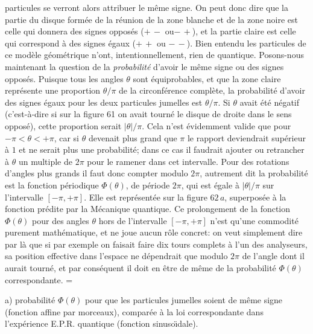 particules se verront alors attribuer le m\^eme signe. On peut donc dire 
que la partie du disque form\'ee de la r\'eunion de la zone blanche et de  
la zone noire est celle  qui donnera des signes oppos\'es ($+\, -$ ou$-\, 
+$), et la partie claire  est celle qui correspond \`a des signes \'egaux 
($+\, +$ ou $-\, -$).    
\medskip 
Bien entendu les particules de ce mod\`ele g\'eom\'etrique n'ont,
intentionnellement, rien de quantique.  
\medskip 
Posons-nous maintenant la question de la {\it probabilit\'e} d'avoir 
le m\^eme signe ou des signes oppos\'es. Puisque tous les angles  
$\theta$ sont \'equiprobables, et que la  zone claire repr\'esente une 
proportion $\theta / \pi$ de la circonf\'erence compl\`ete, la 
probabilit\'e d'avoir des signes \'egaux pour les deux particules jumelles 
est $\theta / \pi$. Si $\theta$ avait \'et\'e n\'egatif (c'est-\`a-dire si 
sur la figure 61 on avait tourn\'e le disque de droite dans le sens 
oppos\'e), cette proportion serait $|\theta | / \pi$. Cela   n'est 
\'evidemment valide que pour $-\pi < \theta < +\pi$, car si $\theta$ 
devenait plus grand que $\pi$ le rapport deviendrait sup\'erieur \`a  
$1$  et ne serait plus une probabilit\'e; dans ce cas il faudrait ajouter  
ou retrancher \`a $\theta$ un multiple de $2\pi$ pour le ramener dans  
cet intervalle. Pour des rotations d'angles plus grands il faut donc 
compter modulo $2\pi$,  autrement dit la probabilit\'e est la fonction  
p\'eriodique $\Phi (\theta )$, de p\'eriode $2\pi$, qui est \'egale \`a 
$|\theta | / \pi$ sur l'intervalle $[-\pi , +\pi ]$. Elle est repr\'esent\'ee 
sur la figure $62\, a$, superpos\'ee \`a la fonction pr\'edite par la 
M\'ecanique quantique. 
\medskip 
Ce prolongement de la fonction $\Phi (\theta )$
pour des angles $\theta$ hors de l'intervalle  $[-\pi , +\pi ]$ n'est qu'une
commodit\'e purement math\'ematique, et ne joue aucun r\^ole concret: 
on veut simplement dire par l\`a que si par exemple on faisait faire dix 
tours complets \`a l'un des analyseurs, sa position effective dans
l'espace ne d\'ependrait que modulo $2\pi$ de l'angle dont il aurait 
tourn\'e,  et par cons\'equent il doit en \^etre de m\^eme de la
probabilit\'e $\Phi (\theta )$ correspondante.
\medskip 
\midinsert 
\epsfxsize=\hsize
{} 
\vskip3mm
\centerline{\vbox{\hsize=11cm 
\eightpoint a) probabilit\'e $\Phi (\theta )$ pour que les 
particules jumelles soient de m\^eme signe (fonction 
affine par morceaux), compar\'ee  \`a la loi correspondante dans 
l'exp\'erience E.P.R. quantique (fonction sinuso\"\i dale).}  } 
\vskip5mm
